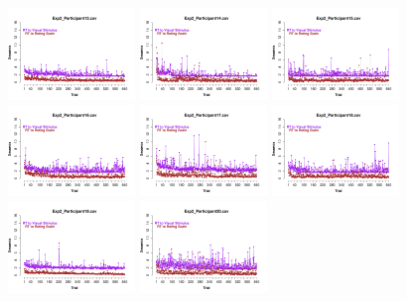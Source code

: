 \begin{figure}[th]
\includegraphics[width=0.30\textwidth]{Figures/RTs_Exp2_P13} \includegraphics[width=0.30\textwidth]{Figures/RTs_Exp2_P14} \includegraphics[width=0.30\textwidth]{Figures/RTs_Exp2_P15}
\includegraphics[width=0.30\textwidth]{Figures/RTs_Exp2_P16} \includegraphics[width=0.30\textwidth]{Figures/RTs_Exp2_P17} \includegraphics[width=0.30\textwidth]{Figures/RTs_Exp2_P18}
\includegraphics[width=0.30\textwidth]{Figures/RTs_Exp2_P19} \includegraphics[width=0.30\textwidth]{Figures/RTs_Exp2_P20} 

\end{figure}

